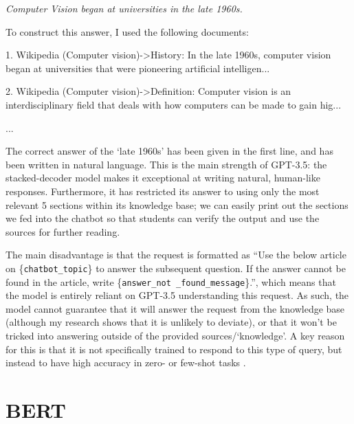 \documentclass{article}
\newenvironment{itquote}
  {\begin{displayquote}\itshape}
  {\end{displayquote}\ignorespacesafterend}
\begin{document}
\begin{itquote}
    Computer Vision began at universities in the late 1960s.

    To construct this answer, I used the following documents: 
    
    1. Wikipedia (Computer vision)->History:
    In the late 1960s, computer vision began at universities that were pioneering artificial intelligen...
    
    2. Wikipedia (Computer vision)->Definition:
    Computer vision is an interdisciplinary field that deals with how computers can be made to gain hig...
    
    ...
\end{itquote}

The correct answer of the `late 1960s' has been given in the first line, and has been written in natural language. This is the main strength of GPT-3.5: the stacked-decoder model makes it exceptional at writing natural, human-like responses. Furthermore, it has restricted its answer to using only the most relevant 5 sections within its knowledge base; we can easily print out the sections we fed into the chatbot so that students can verify the output and use the sources for further reading.

The main disadvantage is that the request is formatted as ``Use the below article on \{\texttt{chatbot\_topic}\} to answer the subsequent question. If the answer cannot be found in the article, write \{\texttt{answer\_not \_found\_message}\}.'', which means that the model is entirely reliant on GPT-3.5 understanding this request. As such, the model cannot guarantee that it will answer the request from the knowledge base (although my research shows that it is unlikely to deviate), or that it won't be tricked into answering outside of the provided sources/`knowledge'. A key reason for this is that it is not specifically trained to respond to this type of query, but instead to have high accuracy in zero- or few-shot tasks \citep{brown2020}. 

\section{BERT}

\end{document}
